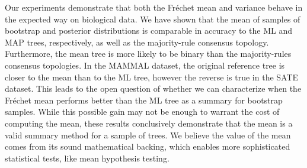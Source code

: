 \documentclass[12pt,letterpaper]{article}
\theoremstyle{plain}
\theoremstyle{definition}
\begin{document}



Our experiments demonstrate that both the Fr\'echet mean and variance behave in the expected way on biological data. We have shown that the mean of samples of bootstrap and posterior distributions is comparable in accuracy to the ML and MAP trees, respectively, as well as the majority-rule consensus topology. Furthermore, the mean tree is more likely to be binary than the majority-rules consensus topologies. In the MAMMAL dataset, the original reference tree is closer to the mean than to the ML tree, however the reverse is true in the SATE dataset.  This leads to the open question of whether we can characterize when the Fr\'echet mean performs better than the ML tree as a summary for bootstrap samples.  While this possible gain may not be enough to warrant the cost of computing the mean, these results conclusively demonstrate that the mean is a valid summary method for a sample of trees.  We believe the value of the mean comes from its sound mathematical backing, which enables more sophisticated statistical tests, like mean hypothesis testing.
\end{document}

